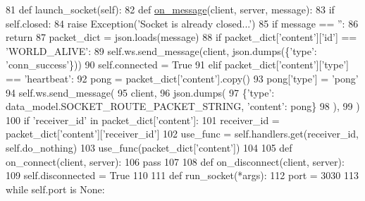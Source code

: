 \begin{DoxyCode}
81     \textcolor{keyword}{def }launch\_socket(self):
82         \textcolor{keyword}{def }\hyperlink{namespaceparlai_1_1chat__service_1_1services_1_1browser__chat_1_1client_a01c1536b48e2f5badd2fe58ea02b9a5c}{on\_message}(client, server, message):
83             \textcolor{keywordflow}{if} self.closed:
84                 \textcolor{keywordflow}{raise} Exception(\textcolor{stringliteral}{'Socket is already closed...'})
85             \textcolor{keywordflow}{if} message == \textcolor{stringliteral}{''}:
86                 \textcolor{keywordflow}{return}
87             packet\_dict = json.loads(message)
88             \textcolor{keywordflow}{if} packet\_dict[\textcolor{stringliteral}{'content'}][\textcolor{stringliteral}{'id'}] == \textcolor{stringliteral}{'WORLD\_ALIVE'}:
89                 self.ws.send\_message(client, json.dumps(\{\textcolor{stringliteral}{'type'}: \textcolor{stringliteral}{'conn\_success'}\}))
90                 self.connected = \textcolor{keyword}{True}
91             \textcolor{keywordflow}{elif} packet\_dict[\textcolor{stringliteral}{'content'}][\textcolor{stringliteral}{'type'}] == \textcolor{stringliteral}{'heartbeat'}:
92                 pong = packet\_dict[\textcolor{stringliteral}{'content'}].copy()
93                 pong[\textcolor{stringliteral}{'type'}] = \textcolor{stringliteral}{'pong'}
94                 self.ws.send\_message(
95                     client,
96                     json.dumps(
97                         \{\textcolor{stringliteral}{'type'}: data\_model.SOCKET\_ROUTE\_PACKET\_STRING, \textcolor{stringliteral}{'content'}: pong\}
98                     ),
99                 )
100             \textcolor{keywordflow}{if} \textcolor{stringliteral}{'receiver\_id'} \textcolor{keywordflow}{in} packet\_dict[\textcolor{stringliteral}{'content'}]:
101                 receiver\_id = packet\_dict[\textcolor{stringliteral}{'content'}][\textcolor{stringliteral}{'receiver\_id'}]
102                 use\_func = self.handlers.get(receiver\_id, self.do\_nothing)
103                 use\_func(packet\_dict[\textcolor{stringliteral}{'content'}])
104 
105         \textcolor{keyword}{def }on\_connect(client, server):
106             \textcolor{keywordflow}{pass}
107 
108         \textcolor{keyword}{def }on\_disconnect(client, server):
109             self.disconnected = \textcolor{keyword}{True}
110 
111         \textcolor{keyword}{def }run\_socket(*args):
112             port = 3030
113             \textcolor{keywordflow}{while} self.port \textcolor{keywordflow}{is} \textcolor{keywordtype}{None}:

\end{DoxyCode}
